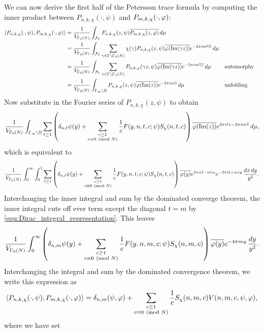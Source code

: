     We can now derive the first half of the Petersson trace formula by computing the inner product between $P_{n,k,\chi}(\cdot,\psi)$ and $P_{m,k,\chi}(\cdot,\varphi)$: 
    \begin{align*}
      \langle P_{n,k,\chi}(\cdot,\psi),P_{m,k,\chi}(\cdot,\varphi)\rangle &= \frac{1}{V_{\Gamma_{0}(N)}}\int_{\mathcal{F}_{\Gamma}}P_{n,k,\chi}(z,\psi)\overline{P_{m,k,\chi}(z,\varphi)}\,d\mu \\
      &= \frac{1}{V_{\Gamma_{0}(N)}}\int_{\mathcal{F}_{\Gamma}}\sum_{\gamma \in \Gamma\backslash\Gamma_{0}(N)}\chi(\gamma)P_{n,k,\chi}(z,\psi)\overline{\varphi(\mathrm{Im}(\gamma z))}e^{-2\pi im\overline{\gamma z}}\,d\mu \\
      &= \frac{1}{V_{\Gamma_{0}(N)}}\int_{\mathcal{F}_{\Gamma}}\sum_{\gamma \in \Gamma\backslash\Gamma_{0}(N)}P_{n,k,\chi}(\gamma z,\psi)\overline{\varphi(\mathrm{Im}(\gamma z))}e^{-2\pi im\overline{\gamma z}}\,d\mu && \text{automorphy} \\
      &= \frac{1}{V_{\Gamma_{0}(N)}}\int_{\Gamma_{\infty}\backslash\mathbb{H}}P_{n,k,\chi}(z,\psi)\overline{\varphi(\mathrm{Im}(z))}e^{-2\pi im\overline{z}}\,d\mu && \text{unfolding}.
    \end{align*}
    Now substitute in the Fourier series of $P_{n,k,\chi}(z,\psi)$ to obtain
    \[
      \frac{1}{V_{\Gamma_{0}(N)}}\int_{\Gamma_{\infty}\backslash\mathbb{H}}\sum_{t \ge 1}\left(\delta_{n,t}\psi(y)+\sum_{\substack{c \ge 1 \\ c \equiv 0 \ \left(\text{mod }N\right)}}\frac{1}{c}F(y,n,t,c;\psi)S_{\chi}(n,t,c)\right)\overline{\varphi(\mathrm{Im}(z))}e^{2\pi itz-2\pi im\overline{z}}\,d\mu,
    \]
    which is equivalent to
    \[
      \frac{1}{V_{\Gamma_{0}(N)}}\int_{0}^{\infty}\int_{0}^{1}\sum_{t \ge 1}\left(\delta_{n,t}\psi(y)+\sum_{\substack{c \ge 1 \\ c \equiv 0 \ \left(\text{mod }N\right)}}\frac{1}{c}F(y,n,t,c;\psi)S_{\chi}(n,t,c)\right)\overline{\varphi(y)}e^{2\pi i(t-m)x}e^{-2\pi(t+m)y}\,\frac{dx\,dy}{y^{2}}.
    \]
    Interchanging the inner integral and sum by the dominated converge theorem, the inner integral cuts off ever term except the diagonal $t = m$ by \cref{equ:Dirac_integral_representation}. This leaves
    \[
      \frac{1}{V_{\Gamma_{0}(N)}}\int_{0}^{\infty}\left(\delta_{n,m}\psi(y)+\sum_{\substack{c \ge 1 \\ c \equiv 0 \ \left(\text{mod }N\right)}}\frac{1}{c}F(y,n,m,c;\psi)S_{\chi}(n,m,c)\right)\overline{\varphi(y)}e^{-4\pi my}\,\frac{dy}{y^{2}}.
    \]
    Interchanging the integral and sum by the dominated convergence theorem, we write this expression as
    \[
      \langle P_{n,k,\chi}(\cdot,\psi),P_{m,k,\chi}(\cdot,\varphi)\rangle = \delta_{n,m}(\psi,\varphi)+\sum_{\substack{c \ge 1 \\ c \equiv 0 \ \left(\text{mod }N\right)}}\frac{1}{c}S_{\chi}(n,m,c)V(n,m,c,\psi,\varphi),
    \]
    where we have set
